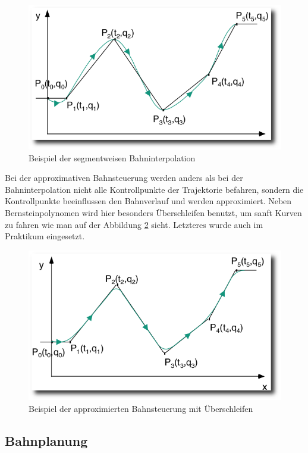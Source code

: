 \begin{figure}[h]
	\center
	\includegraphics[scale=0.35]{graphics/segmentinterpolation.png}
	\caption{\label{fig:segmentinterpolation} Beispiel der segmentweisen Bahninterpolation \citep{rob1}}
\end{figure}
 
Bei der approximativen Bahnsteuerung werden anders als bei der Bahninterpolation nicht alle Kontrollpunkte der Trajektorie befahren, sondern die Kontrollpunkte beeinflussen den Bahnverlauf und werden approximiert.
Neben Bernsteinpolynomen wird hier besonders Überschleifen benutzt, um sanft Kurven zu fahren wie man auf der Abbildung \ref{fig:ueberschleifeninterpolation} sieht.
Letzteres wurde auch im Praktikum eingesetzt.
\begin{figure}[h]
	\center
	\includegraphics[scale=0.35]{graphics/ueberschleifeninterpolation.png}
	\caption{\label{fig:ueberschleifeninterpolation} Beispiel der approximierten Bahnsteuerung mit Überschleifen \citep{rob1}}
\end{figure}

\subsection{Bahnplanung}
\label{bahnplanung_grundlagen_sec}
\authorsection{\editoroier}

